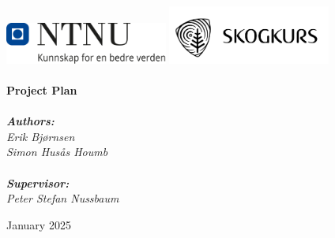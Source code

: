 
\begin{titlepage}
\vbox{ }
\vbox{ }
\begin{center}
\includegraphics[width=0.40\textwidth]{Images/NTNU_logo.png}
\includegraphics[width=0.40\textwidth]{Images/skogkurs_logo_tekst.png}
\\[1cm]

\HRule \\[0.6cm]
{ \huge \bfseries Project Plan}\\[0.4cm]
\HRule \\[1.5cm]

\large
\textbf{\emph{Authors:}}\\
\emph{Erik Bjørnsen}\\
\emph{Simon Husås Houmb}\\ 
\hfill\\
\textbf{\emph{Supervisor:}}\\
\emph{Peter Stefan Nussbaum}
\vfill

{\large January 2025}
\end{center}
\end{titlepage}